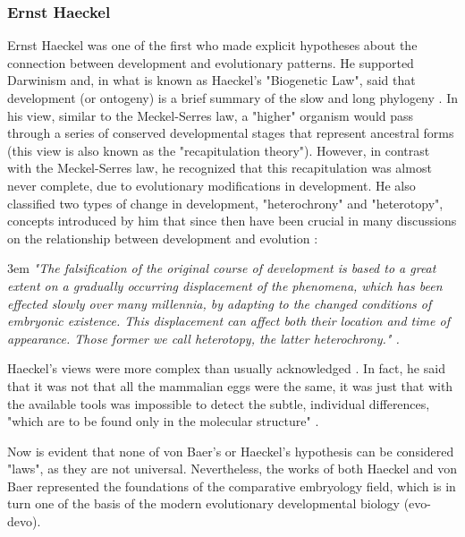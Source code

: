 \subsubsection{Ernst Haeckel}
Ernst Haeckel was one of the first who made explicit hypotheses about the connection between development and evolutionary patterns.
He supported Darwinism and, in what is known as Haeckel's "Biogenetic Law", said that development (or ontogeny) is a brief summary of the slow and long phylogeny \citep{haeckel1874menschen}.
In his view, similar to the Meckel-Serres law, a "higher" organism would pass through a series of conserved developmental stages that represent ancestral forms (this view is also known as the "recapitulation theory").
However, in contrast with the Meckel-Serres law, he recognized that this recapitulation was almost never complete, due to evolutionary modifications in development. 
He also classified two types of change in development, "heterochrony" and "heterotopy", concepts introduced by him that since then have been crucial in many discussions on the relationship between development and evolution \citep{Horder2013}:
\begin{flushleft}
\leftskip3em
\rightskip\leftskip
\footnotesize{
\textit{"The falsification of the original course of development is based to a great extent on a gradually occurring displacement of the phenomena, which has been effected slowly over many millennia, by adapting to the changed conditions of embryonic existence. This displacement can affect both their location and time of appearance. Those former we call heterotopy, the latter heterochrony." \citep{haeckel1903anthropogenie}.}}
\end{flushleft}
Haeckel's views were more complex than usually acknowledged \citep{Richardson2002}.
In fact, he said that it was not that all the mammalian eggs were the same, it was just that with the available tools was impossible to detect the subtle, individual differences, "which are to be found only in the molecular structure" \citep{haeckel1903anthropogenie}.

Now is evident that none of von Baer's or Haeckel's hypothesis can be considered "laws", as they are not universal.
Nevertheless, the works of both Haeckel and von Baer represented the foundations of the comparative embryology field, which is in turn one of the basis of the modern evolutionary developmental biology (evo-devo).



